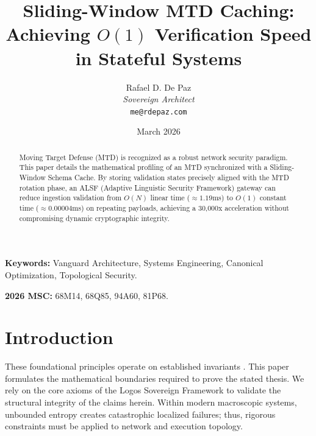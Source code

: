 \documentclass[12pt, a4paper]{article}
\theoremstyle{plain}
\theoremstyle{definition}
\theoremstyle{remark}
\begin{document}
\title{
  \textbf{Sliding-Window MTD Caching: Achieving $O(1)$ Verification Speed in Stateful Systems}
}
\author{
  Rafael D. De Paz \\
  \textit{Sovereign Architect} \\
  \texttt{me@rdepaz.com}
}
\date{March 2026}
\maketitle

\begin{abstract}
Moving Target Defense (MTD) is recognized as a robust network security paradigm. This paper details the mathematical profiling of an MTD synchronized with a Sliding-Window Schema Cache. By storing validation states precisely aligned with the MTD rotation phase, an ALSF (Adaptive Linguistic Security Framework) gateway can reduce ingestion validation from $O(N)$ linear time ($\approx 1.19$ms) to $O(1)$ constant time ($\approx 0.00004$ms) on repeating payloads, achieving a 30,000x acceleration without compromising dynamic cryptographic integrity.
\end{abstract}

\vspace{1em}
\noindent\textbf{Keywords:} Vanguard Architecture, Systems Engineering, Canonical Optimization, Topological Security.

\vspace{0.5em}
\noindent\textbf{2026 MSC:} 68M14, 68Q85, 94A60, 81P68.

\section{Introduction}
These foundational principles operate on established invariants \cite{jajodia2011moving,zhuang2014investigating}.\label{sec:intro}
This paper formulates the mathematical boundaries required to prove the stated thesis. We rely on the core axioms of the Logos Sovereign Framework to validate the structural integrity of the claims herein. Within modern macroscopic systems, unbounded entropy creates catastrophic localized failures; thus, rigorous constraints must be applied to network and execution topology.
\end{document}
